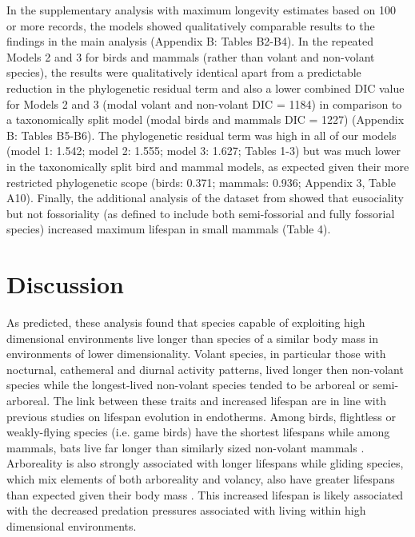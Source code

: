 In the supplementary analysis with maximum longevity estimates based on 100 or more records, the models showed qualitatively comparable results to the findings in the main analysis (Appendix B: Tables B2-B4). In the repeated Models 2 and 3 for birds and mammals (rather than volant and non-volant species), the results were qualitatively identical apart from a predictable reduction in the phylogenetic residual term and also a lower combined DIC value for Models 2 and 3 (modal volant and non-volant DIC = 1184) in comparison to a taxonomically split model (modal birds and mammals DIC  = 1227) (Appendix B: Tables B5-B6). The phylogenetic residual term was high in all of our models (model 1: 1.542; model 2: 1.555; model 3: 1.627; Tables 1-3) but was much lower in the taxonomically split bird and mammal models, as expected given their more restricted phylogenetic scope (birds: 0.371; mammals: 0.936; Appendix 3, Table A10). Finally, the additional analysis of the dataset from \cite{williams2015ecology} showed that eusociality but not fossoriality (as defined to include both semi-fossorial and fully fossorial species) increased maximum lifespan in small mammals (Table 4).



\section{Discussion}

As predicted, these analysis found that species capable of exploiting high dimensional environments live longer than species of a similar body mass in environments of lower dimensionality. Volant species, in particular those with nocturnal, cathemeral and diurnal activity patterns, lived longer then non-volant species while the longest-lived non-volant species tended to be arboreal or semi-arboreal. The link between these traits and increased lifespan are in line with previous studies on lifespan evolution in endotherms. Among birds, flightless or weakly-flying species (i.e. game birds) have the shortest lifespans \citep{ricklefs2010life,Williams1957,wilkinson2002life} while among mammals, bats live far longer than similarly sized non-volant mammals \citep{wilkinson2002life,austad1991mammalian}. Arboreality is also strongly associated with longer lifespans \citep{shattuck2010arboreality} while gliding species, which mix elements of both arboreality and volancy, also have greater lifespans than expected given their body mass \citep{holmes1994fly}. This increased lifespan is likely associated with the decreased predation pressures associated with living within high dimensional environments.


